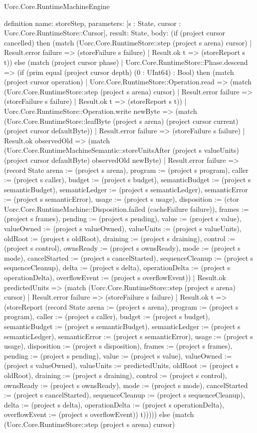 \begin{lexlean}{Uorc.Core.RuntimeMachineEngine}
\begin{semanticmodule}
definition{
  name: storeStep,
  parameters: [s : State, cursor : Uorc.Core.RuntimeStore::Cursor],
  result: State,
  body: (if (project cursor cancelled) then (match (Uorc.Core.RuntimeStore::step (project s arena) cursor)
    | Result.error failure => (storeFailure s failure)
    | Result.ok t => (storeReport s t)) else (match (project cursor phase)
    | Uorc.Core.RuntimeStore::Phase.descend => (if (prim equal (project cursor depth) (0 : UInt64) : Bool) then (match (project cursor operation)
      | Uorc.Core.RuntimeStore::Operation.read => (match (Uorc.Core.RuntimeStore::step (project s arena) cursor)
        | Result.error failure => (storeFailure s failure)
        | Result.ok t => (storeReport s t))
      | Uorc.Core.RuntimeStore::Operation.write newByte => (match (Uorc.Core.RuntimeStore::leafByte (project s arena) (project cursor current) (project cursor defaultByte))
        | Result.error failure => (storeFailure s failure)
        | Result.ok observedOld => (match (Uorc.Core.RuntimeMachineSemantic::storeUnitsAfter (project s valueUnits) (project cursor defaultByte) observedOld newByte)
          | Result.error failure => (record State {arena := (project s arena), program := (project s program), caller := (project s caller), budget := (project s budget), semanticBudget := (project s semanticBudget), semanticLedger := (project s semanticLedger), semanticError := (project s semanticError), usage := (project s usage), disposition := (ctor Uorc.Core.RuntimeMachine::Disposition.failed (cacheFailure failure)), frames := (project s frames), pending := (project s pending), value := (project s value), valueOwned := (project s valueOwned), valueUnits := (project s valueUnits), oldRoot := (project s oldRoot), draining := (project s draining), control := (project s control), ownsReady := (project s ownsReady), mode := (project s mode), cancelStarted := (project s cancelStarted), sequenceCleanup := (project s sequenceCleanup), delta := (project s delta), operationDelta := (project s operationDelta), overflowEvent := (project s overflowEvent)})
          | Result.ok predictedUnits => (match (Uorc.Core.RuntimeStore::step (project s arena) cursor)
            | Result.error failure => (storeFailure s failure)
            | Result.ok t => (storeReport (record State {arena := (project s arena), program := (project s program), caller := (project s caller), budget := (project s budget), semanticBudget := (project s semanticBudget), semanticLedger := (project s semanticLedger), semanticError := (project s semanticError), usage := (project s usage), disposition := (project s disposition), frames := (project s frames), pending := (project s pending), value := (project s value), valueOwned := (project s valueOwned), valueUnits := predictedUnits, oldRoot := (project s oldRoot), draining := (project s draining), control := (project s control), ownsReady := (project s ownsReady), mode := (project s mode), cancelStarted := (project s cancelStarted), sequenceCleanup := (project s sequenceCleanup), delta := (project s delta), operationDelta := (project s operationDelta), overflowEvent := (project s overflowEvent)}) t))))) else (match (Uorc.Core.RuntimeStore::step (project s arena) cursor)
}
\end{semanticmodule}
\end{lexlean}
